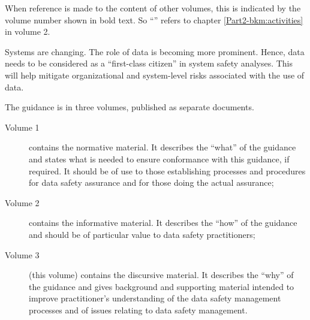 When reference is made to the content of other volumes, this is indicated by the volume number shown in bold text. So ``'' refers to chapter \ref*{Part2-bkm:activities} in volume 2.


Systems are changing. The role of data is becoming more prominent. Hence, data needs to be considered as a ``first-class citizen'' in system safety analyses. This will help mitigate organizational and system-level risks associated with the use of data.

The guidance is in three volumes, published as separate documents.
\begin{description}
	\item[Volume 1] contains the normative material. It describes the ``what'' of the guidance and states what is needed to ensure conformance with this guidance, if required. It should be of use to those establishing processes and procedures for data safety assurance and for those doing the actual assurance;
	\item[Volume 2] contains the informative material. It describes the ``how'' of the guidance and should be of particular value to data safety practitioners;
	\item[Volume 3] (this volume) contains the discursive material. It describes the ``why'' of the guidance and gives background and supporting material intended to improve practitioner's understanding of the data safety management processes and of issues relating to data safety management.
\end{description}

